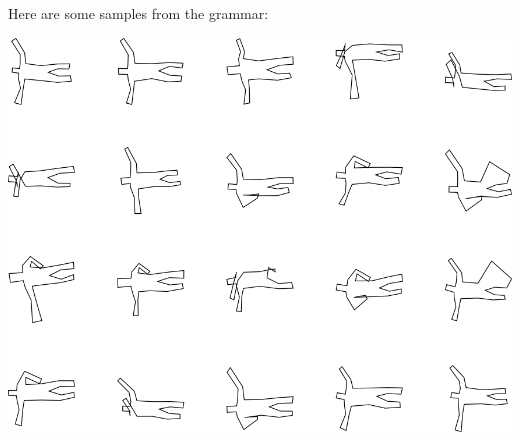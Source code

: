 Here are some samples from the grammar:

\includegraphics[width=6in]{output/3.learning/incremental/gram.16.d/samples.png}

